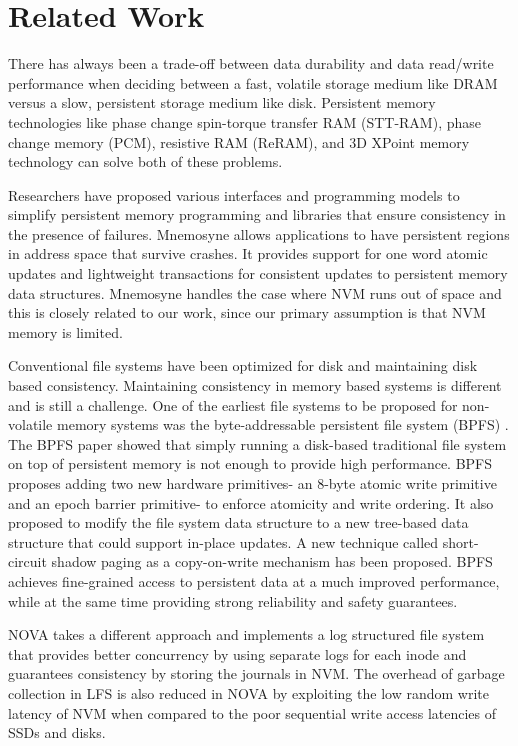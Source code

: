 
\section{Related Work}

There has always been a trade-off between data durability and data read/write performance when deciding between a fast, volatile storage medium like DRAM versus a slow, persistent storage medium like disk. Persistent memory technologies like phase change spin-torque transfer RAM (STT-RAM), phase change memory (PCM), resistive RAM (ReRAM), and 3D XPoint memory technology can solve both of these problems\cite{c9}.

Researchers have proposed various interfaces and programming models \cite{c4,c6} to simplify persistent memory programming and libraries that ensure consistency in the presence of failures. Mnemosyne \cite{c6} allows applications to have persistent regions in address space that survive crashes. It provides support for one word atomic updates and lightweight transactions for consistent updates to persistent memory data structures. Mnemosyne handles the case where NVM runs out of space and this is closely related to our work, since our primary assumption is that NVM memory is limited.

Conventional file systems have been optimized for disk and maintaining disk based consistency. Maintaining consistency in memory based systems is different and is still a challenge. One of the earliest file systems to be proposed for non-volatile memory systems was the byte-addressable persistent file system (BPFS) \cite{c10}. The BPFS paper showed that simply running a disk-based traditional file system on top of persistent memory is not enough to provide high performance. BPFS proposes adding two new hardware primitives- an 8-byte atomic write primitive and an epoch barrier primitive- to enforce atomicity and write ordering. It also proposed to modify the file system data structure to a new tree-based data structure that could support in-place updates. A new technique called short-circuit shadow paging as a copy-on-write mechanism has been proposed. BPFS achieves fine-grained access to persistent data at a much improved performance, while at the same time providing strong reliability and safety guarantees. 

NOVA \cite{c8} takes a different approach and implements a log structured file system that provides better concurrency by using separate logs for each inode and guarantees consistency by storing the journals in NVM. The overhead of garbage collection in LFS is also reduced in NOVA by exploiting the low random write latency of NVM when compared to the poor sequential write access latencies of SSDs and disks.

